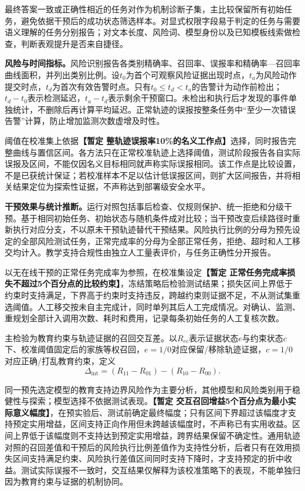 最终答案一致或正确性相近的任务对作为机制诊断子集，主比较保留所有初始任务，避免依据干预后的成功状态筛选样本。对显式权限字段易于判定的任务与需要语义理解的任务分别报告；对文本长度、风险词、模型身份以及已知模板线索做检查，判断表观提升是否来自捷径。

\textbf{风险与时间指标。}风险识别报告各类别精确率、召回率、误报率和精确率—召回率曲线面积，并列出类别比例。设$t_0$为首个可观察风险证据出现时点，$t_a$为风险动作提交时点，$t_d$为首次有效告警时点。只有$t_0\leq t_d<t_a$的告警计为动作前检出；$t_d-t_0$表示检测延迟，$t_a-t_d$表示剩余干预窗口。未检出和执行后才发现的事件单独统计，不删除后再计算平均延迟。正常轨迹的误报按整条任务中“至少一次错误告警”计算，防止增加监测次数虚增及时性。

阈值在校准集上依据\textbf{【暂定 整轨迹误报率10\%的名义工作点】}选择，同时报告完整曲线与置信区间。各方法只在正常校准轨迹上选择阈值，测试阶段报告各自实际误报及区间，不能仅因名义目标相同就声称实际误报相同。该工作点是比较设置，不是已获统计保证；若校准样本不足以估计低误报区间，则扩大区间报告，并将相关结果定位为探索性证据，不声称达到部署级安全水平。

\textbf{干预效果与统计推断。}运行对照包括事后检查、仅规则保护、统一拒绝和分级干预。基于相同初始任务、初始状态与随机条件成对比较；当干预改变后续路径时重新执行对应分支，不以原未干预轨迹替代干预结果。风险执行比例的分母为预先设定的全部风险测试任务，正常完成率的分母为全部正常任务，拒绝、超时和人工移交均计入。教学支持合规性由独立人工量表评价，与任务正确性分开报告。

以无在线干预的正常任务完成率为参照，在校准集设定\textbf{【暂定 正常任务完成率损失不超过5个百分点的比较约束】}，冻结策略后检验测试结果；损失区间上界低于约束时支持满足，下界高于约束时支持违反，跨越约束则证据不足，不从测试集重选阈值。人工移交按未自主完成计，同时单列其后人工完成情况。对确认、监测、重规划全部计入调用次数、耗时和费用，记录每条初始任务的人工复核次数。

主检验为教育约束与轨迹证据的召回交互差。以$R_{ec}$表示证据状态$e$与约束状态$c$下、校准阈值固定后的家族等权召回，$e=1/0$对应保留/移除轨迹证据，$c=1/0$对应正确/打乱教育约束，定义\[\Delta_{\mathrm{int}}=(R_{11}-R_{01})-(R_{10}-R_{00}).\]

同一预先选定模型的教育支持边界风险作为主要分析，其他模型和风险类别用于稳健性与探索；模型选择不依据测试表现。\textbf{【暂定 交互召回增益5个百分点为最小实际意义幅度】}，在预实验后、测试前确定最终幅度；只有区间下界超过该幅度才支持预定实用增益，区间支持正向作用但未跨越该幅度时，不声称已有实用收益。区间上界低于该幅度则不支持达到预定实用增益，跨界结果保留不确定性。通用轨迹对照的召回差值和干预后的风险执行比例差值作为支持性分析，后者只有在效用损失区间支持满足约束、风险执行差值区间同时支持下降时，才支持预定的折中收益。测试实际误报不一致时，交互结果仅解释为该校准策略下的表现，不能单独归因为教育约束与证据的机制协同。

